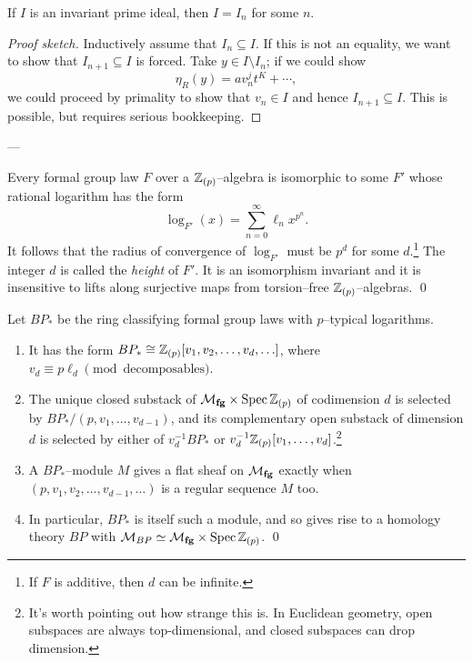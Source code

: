 \begin{theorem}
If $I$ is an invariant prime ideal, then $I = I_n$ for some $n$.
\end{theorem}
\begin{proof}[Proof sketch]
Inductively assume that $I_n \subseteq I$.  If this is not an equality, we want to show that $I_{n+1} \subseteq I$ is forced.  Take $y \in I \setminus I_n$; if we could show \[\eta_R(y) = a v_n^j t^K + \cdots,\] we could proceed by primality to show that $v_n \in I$ and hence $I_{n+1} \subseteq I$.  This is possible, but requires serious bookkeeping.
\end{proof}



---

\begin{theorem}[Hazewinkel]
Every formal group law $F$ over a $\mathbb Z_{(p)}$--algebra is isomorphic to some $F'$ whose rational logarithm has the form \[\log_{F'}(x) = \sum_{n=0}^\infty \ell_n x^{p^n}.\]  It follows that the radius of convergence of $\log_{F'}$ must be $p^d$ for some $d$.\footnote{If $F$ is additive, then $d$ can be infinite.}  The integer $d$ is called the \emph{height} of $F'$.  It is an isomorphism invariant and it is insensitive to lifts along surjective maps from torsion--free $\mathbb Z_{(p)}$--algebras. \qed {}
\end{theorem}

\begin{theorem}
Let $BP_*$ be the ring classifying formal group laws with $p$--typical logarithms.
\begin{enumerate}
\item It has the form $BP_* \cong \mathbb Z_{(p)}[v_1, v_2, \ldots, v_d, \ldots]$, where $v_d \equiv p \ell_d \pmod{\text{decomposables}}$.
\item The unique closed substack of $\mathcal{M}_{\mathbf{fg}} \times \operatorname{Spec} \mathbb Z_{(p)}$ of codimension $d$ is selected by $BP_* / (p, v_1, \ldots, v_{d-1})$, and its complementary open substack of dimension $d$ is selected by either of $v_d^{-1} BP_*$ or $v_d^{-1} \mathbb Z_{(p)}[v_1, \ldots, v_d]$.\footnote{It's worth pointing out how strange this is. In Euclidean geometry, open subspaces are always top-dimensional, and closed subspaces can drop dimension.}
\item A $BP_*$--module $M$ gives a flat sheaf on $\mathcal{M}_{\mathbf{fg}}$ exactly when $(p, v_1, v_2, \ldots, v_{d-1}, \ldots)$ is a regular sequence $M$ too.
\item In particular, $BP_*$ is itself such a module, and so gives rise to a homology theory $BP$ with $\mathcal{M}_{BP} \simeq \mathcal{M}_{\mathbf{fg}} \times \operatorname{Spec} \mathbb Z_{(p)}$. \qed
\end{enumerate}
\end{theorem}







